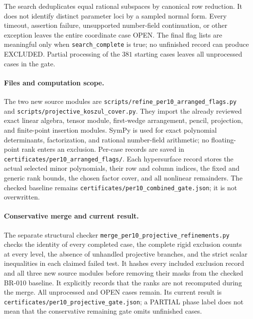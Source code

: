 The search deduplicates equal rational subspaces by canonical row
reduction.  It does not identify distinct parameter loci by a sampled
normal form.  Every timeout, assertion failure, unsupported number-field
continuation, or other exception leaves the entire coordinate case OPEN.
The final flag lists are meaningful only when \texttt{search\_complete}
is true; no unfinished record can produce EXCLUDED.  Partial processing
of the $381$ starting cases leaves all unprocessed cases in the gate.

\paragraph{Files and computation scope.}
The two new source modules are
\texttt{scripts/refine\_per10\_arranged\_flags.py} and
\texttt{scripts/projective\_koszul\_cover.py}.
They import the already reviewed exact linear algebra, tensor module,
first-wedge arrangement, pencil, projection, and finite-point insertion
modules.  SymPy is used for exact polynomial determinants, factorization,
and rational number-field arithmetic; no floating-point rank enters an
exclusion.  Per-case records are saved in
\texttt{certificates/per10\_arranged\_flags/}.  Each hypersurface record
stores the actual selected minor polynomials, their row and column
indices, the fixed and generic rank bounds, the chosen factor cover,
and all nonlinear remainders.  The checked baseline remains
\texttt{certificates/per10\_combined\_gate.json}; it is not overwritten.

\paragraph{Conservative merge and current result.}
The separate structural checker \texttt{merge\_per10\_projective\_refinements.py}
checks the identity of every completed case, the complete rigid exclusion
counts at every level, the absence of unhandled projective branches, and
the strict scalar inequalities in each claimed failed test.  It hashes
every included exclusion record and all three new source modules before
removing their masks from the checked BR-010 baseline.  It explicitly
records that the ranks are not recomputed during the merge.  All
unprocessed and OPEN cases remain.  Its current result is
\texttt{certificates/per10\_projective\_gate.json}; a PARTIAL phase label
does not mean that the conservative remaining gate omits unfinished cases.
